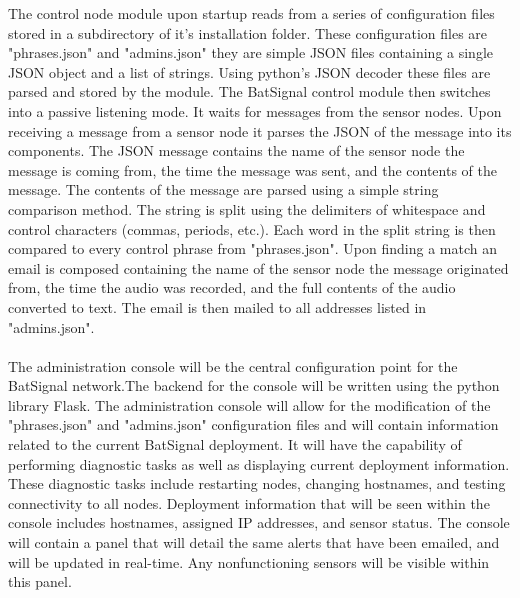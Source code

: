 \documentclass[11pt,a4paper]{article}
\begin{document}
The control node module upon startup reads from a series of configuration files stored in a subdirectory of it's installation folder.  These configuration files are "phrases.json" and "admins.json" they are simple JSON files containing a single JSON object and a list of strings.  Using python's JSON decoder these files are parsed and stored by the module.  The BatSignal control module then switches into a passive listening mode.  It waits for messages from the sensor nodes.  Upon receiving a message from a sensor node it parses the JSON of the message into its components.  The JSON message contains the name of the sensor node the message is coming from, the time the message was sent, and the contents of the message.  The contents of the message are parsed using a simple string comparison method.  The string is split using the delimiters of whitespace and control characters (commas, periods, etc.).  Each word in the split string is then compared to every control phrase from "phrases.json".  Upon finding a match an email is composed containing the name of the sensor node the message originated from, the time the audio was recorded, and the full contents of the audio converted to text.  The email is then mailed to all addresses listed in "admins.json".  \\\\
The administration console will be the central configuration point for the BatSignal network.The backend for the console will be written using the python library Flask.  The administration console will allow for the modification of the "phrases.json" and "admins.json" configuration files and will contain information related to the current BatSignal deployment.  It will have the capability of performing diagnostic tasks as well as displaying current deployment information.  These diagnostic tasks include restarting nodes, changing hostnames, and testing connectivity to all nodes.  Deployment information that will be seen within the console includes hostnames, assigned IP addresses, and sensor status.  The console will contain a panel that will detail the same alerts that have been emailed, and will be updated in real-time.  Any nonfunctioning sensors will be visible within this panel.      \\\\ 
\end{document}
